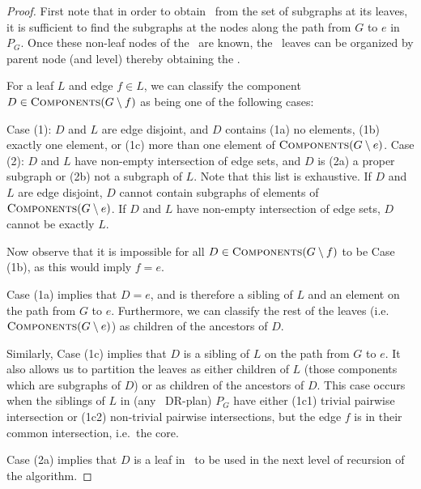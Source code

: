
\begin{proof}
    First note that in order to obtain \branchGePG\ from the set of subgraphs at its leaves, it is sufficient to find the subgraphs at the nodes along the path from $G$ to $e$ in $P_G$. Once these non-leaf nodes of the \branch\ are known, the \branch\ leaves can be organized by parent node (and level) thereby obtaining the \branch.

    For a leaf $L$ and edge $f\in L$, we can classify the component $D\in \textsc{Components}(G\setminus f)$ as being one of the following cases:

    Case (1):
    $D$ and $L$ are edge disjoint, and $D$ contains
    (1a) no elements,
    (1b) exactly one element, or
    (1c) more than one element
    of $\textsc{Components}(G\setminus e)$.
    Case (2):
    $D$ and $L$ have non-empty intersection of edge sets, and $D$ is
    (2a)
    a proper subgraph or
    (2b)
    not a subgraph
    of $L$.
    Note that this list is exhaustive. If $D$ and $L$ are edge disjoint, $D$ cannot contain subgraphs of elements of $\textsc{Components}(G\setminus e)$. If $D$ and $L$ have non-empty intersection of edge sets, $D$ cannot be exactly $L$.

    Now observe that it is impossible for all $D\in \textsc{Components}(G\setminus f)$ to be Case (1b), as this would imply $f=e$.

    Case (1a) implies that $D=e$, and is therefore a sibling of $L$ and an element on the path from $G$ to $e$. Furthermore, we can classify the rest of the leaves (i.e.\ $\textsc{Components}(G\setminus e)$) as children of the ancestors of $D$.

    Similarly, Case (1c) implies that $D$ is a sibling of $L$ on the path from $G$ to $e$. It also allows us to partition the leaves as either children of $L$ (those components which are subgraphs of $D$) or as children of the ancestors of $D$. This case occurs when the siblings of $L$ in (any \pseudosequential\ DR-plan) $P_G$ have either (1c1) trivial pairwise intersection or (1c2) non-trivial pairwise intersections, but the edge $f$ is in their common intersection, i.e.\ the core.

    Case (2a) implies that $D$ is a leaf in \branchLfPL\ to be used in the next level of recursion of the algorithm.


\end{proof}
